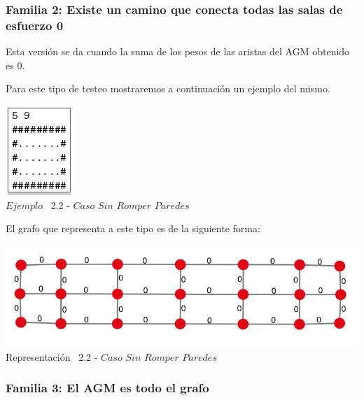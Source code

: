  \begin{center}
 \subsubsection*{Familia 2: Existe un camino que conecta todas las salas de esfuerzo 0}
\end{center}

Esta versi\'on se da cuando la suma de los pesos de las aristas del AGM obtenido es 0. 

Para este tipo de testeo mostraremos a continuaci\'on un ejemplo del mismo.\\

\vspace*{0.3cm} \vspace*{0.3cm}
  \begin{center}
 \includegraphics[scale=1.6]{./EJ2/ej2sinpared.jpeg}
 \\{$Ejemplo$ \ 2.2 - $Caso$ $Sin$ $Romper$ $Paredes$}
  \end{center}
  \vspace*{0.3cm}

El grafo que representa a este tipo es de la siguiente forma:\\

\vspace*{0.3cm} \vspace*{0.3cm}
  \begin{center}
 \includegraphics[scale=0.5]{./EJ2/ej2grafosinpared.jpeg}
 \\{Representación \ 2.2 - $Caso$ $Sin$ $Romper$ $Paredes$}
  \end{center}
  \vspace*{0.3cm}
  
\begin{center}
\subsubsection*{Familia 3: El AGM es todo el grafo}
\end{center}

